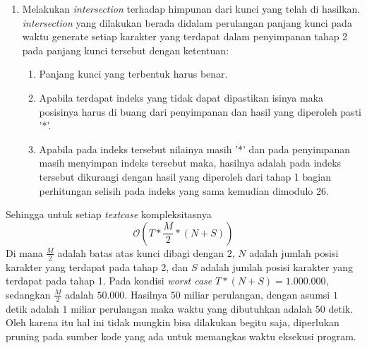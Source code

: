 \begin{enumerate}
	\item Melakukan \textit{intersection} terhadap himpunan dari kunci yang telah di hasilkan\cite{john_jones_spoj_2009}. \textit{intersection} yang dilakukan berada didalam perulangan panjang kunci pada waktu generate setiap karakter yang terdapat dalam penyimpanan tahap 2 pada panjang kunci tersebut dengan ketentuan:
	\begin{enumerate}
	\item Panjang kunci yang terbentuk harus benar.
	\item Apabila terdapat indeks yang tidak dapat dipastikan isinya maka posisinya harus di buang dari penyimpanan dan hasil yang diperoleh pasti '*'.
	\item Apabila \plaintext pada indeks tersebut nilainya masih '*' dan pada penyimpanan masih menyimpan indeks tersebut maka, hasilnya adalah \ciphertext pada indeks tersebut dikurangi dengan hasil yang diperoleh dari tahap 1 bagian perhitungan selisih pada indeks yang sama kemudian dimodulo 26.
	\end{enumerate}
	\end{enumerate}
	Sehingga untuk setiap \textit{textcase} kompleksitasnya 
	$$\mathcal{O}(T*\frac{M}{2}*(N+S))$$ 
	Di mana $\frac{M}{2}$ adalah batas atas kunci dibagi dengan $2$, $N$ adalah jumlah posisi karakter yang terdapat pada tahap 2, dan $S$ adalah jumlah posisi karakter yang terdapat pada tahap 1. Pada kondisi \textit{worst case} $T*(N+S)=1.000.000$, sedangkan $\frac{M}{2}$ adalah $50.000$. Hasilnya $50$ miliar perulangan, dengan asumsi $1$ detik adalah $1$ miliar perulangan maka waktu yang dibutuhkan adalah $50$ detik. Oleh karena itu hal ini tidak mungkin bisa dilakukan begitu saja, diperlukan pruning pada sumber kode yang ada untuk memangkas waktu eksekusi program.